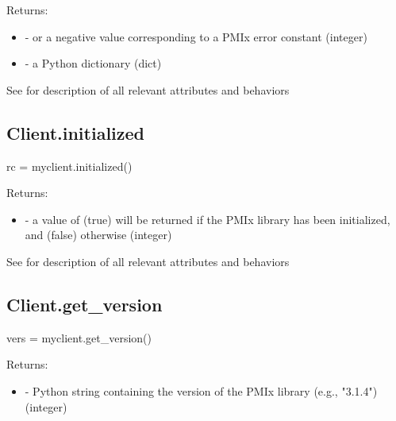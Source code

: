 Returns:

\begin{itemize}
    \item {} -  or a negative value corresponding to a PMIx error constant (integer)
    \item {} - a Python  dictionary (dict)
\end{itemize}


See  for description of all relevant attributes and behaviors

\subsection{Client.initialized}

\format

\pyspecificstart
\begin{codepar}
rc = myclient.initialized()
\end{codepar}
\pyspecificend



Returns:

\begin{itemize}
    \item {} - a value of  (true) will be returned if the \ac{PMIx} library has been initialized, and  (false) otherwise (integer)

\end{itemize}


See  for description of all relevant attributes and behaviors

\subsection{Client.get_version}

\format

\pyspecificstart
\begin{codepar}
vers = myclient.get_version()
\end{codepar}
\pyspecificend



Returns:

\begin{itemize}
    \item {} - Python string containing the version of the \ac{PMIx} library (e.g., "3.1.4") (integer)

\end{itemize}


